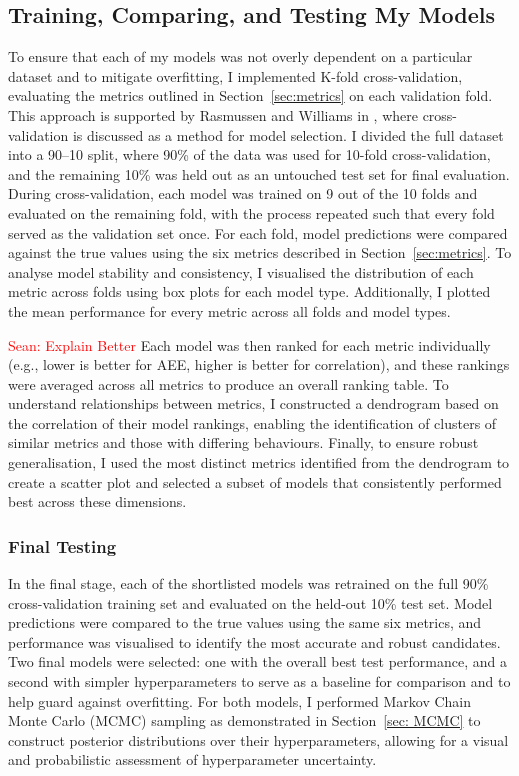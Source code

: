 \documentclass[12pt]{article}
\newcommand{\Sean}[1]{{\textcolor{red}{{Sean: #1}} }}
\begin{document}
\subsection{Training, Comparing, and Testing My Models}
%
%
To ensure that each of my models was not overly dependent on a particular dataset and to mitigate overfitting, I implemented K-fold cross-validation, evaluating the metrics outlined in Section~\ref{sec:metrics} on each validation fold. This approach is supported by Rasmussen and Williams in \cite[Ch.5]{bible}, where cross-validation is discussed as a method for model selection.
I divided the full dataset into a 90--10 split, where 90\% of the data was used for 10-fold cross-validation, and the remaining 10\% was held out as an untouched test set for final evaluation.
During cross-validation, each model was trained on 9 out of the 10 folds and evaluated on the remaining fold, with the process repeated such that every fold served as the validation set once. For each fold, model predictions were compared against the true values using the six metrics described in Section~\ref{sec:metrics}.
To analyse model stability and consistency, I visualised the distribution of each metric across folds using box plots for each model type. Additionally, I plotted the mean performance for every metric across all folds and model types.

\Sean{Explain Better}Each model was then ranked for each metric individually (e.g., lower is better for AEE, higher is better for correlation), and these rankings were averaged across all metrics to produce an overall ranking table. To understand relationships between metrics, I constructed a dendrogram based on the correlation of their model rankings, enabling the identification of clusters of similar metrics
and those with differing behaviours. Finally, to ensure robust generalisation, I used the most distinct metrics identified from the dendrogram to create a scatter plot and selected a subset of models that consistently performed best across these dimensions.

 \subsubsection*{Final Testing}
In the final stage, each of the shortlisted models was retrained on the full 90\% cross-validation training set and evaluated on the held-out 10\% test set. Model predictions were compared to the true values using the same six metrics, and performance was visualised to identify the most accurate and robust candidates.
Two final models were selected: one with the overall best test performance, and a second with simpler hyperparameters to serve as a baseline for comparison and to help guard against overfitting. For both models, I performed Markov Chain Monte Carlo (MCMC) sampling as demonstrated in Section~\ref{sec: MCMC}
to construct posterior distributions over their hyperparameters, allowing for a visual and probabilistic assessment of hyperparameter uncertainty.
 
\end{document}

